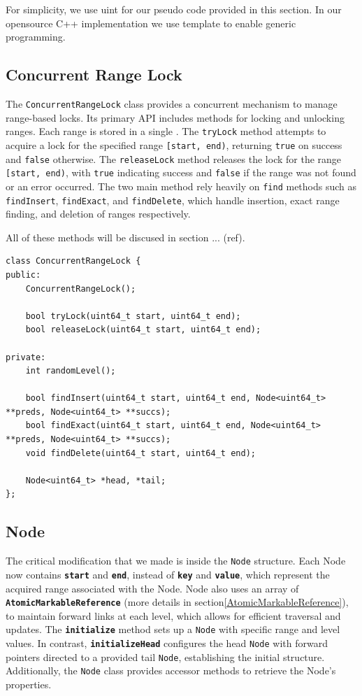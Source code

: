For simplicity, we use uint for our pseudo code provided in this section. In our opensource C++ implementation we use template to enable generic programming.

\subsection{Concurrent Range Lock}

The \texttt{ConcurrentRangeLock} class provides a concurrent mechanism to manage range-based locks. Its primary API includes methods for locking and unlocking ranges. Each range is stored in a single \texttt{}. The \texttt{tryLock} method attempts to acquire a lock for the specified range \texttt{[start, end)}, returning \texttt{true} on success and \texttt{false} otherwise. The \texttt{releaseLock} method releases the lock for the range \texttt{[start, end)}, with \texttt{true} indicating success and \texttt{false} if the range was not found or an error occurred. The two main method rely heavily on \texttt{find} methods such as \texttt{findInsert}, \texttt{findExact}, and \texttt{findDelete}, which handle insertion, exact range finding, and deletion of ranges respectively.

All of these methods will be discused in section ... (ref).

\begin{lstlisting}[style=mystyle, caption=Concurrent Range Lock]
class ConcurrentRangeLock {
public:
    ConcurrentRangeLock();

    bool tryLock(uint64_t start, uint64_t end);
    bool releaseLock(uint64_t start, uint64_t end);

private:
    int randomLevel();

    bool findInsert(uint64_t start, uint64_t end, Node<uint64_t> **preds, Node<uint64_t> **succs);
    bool findExact(uint64_t start, uint64_t end, Node<uint64_t> **preds, Node<uint64_t> **succs);
    void findDelete(uint64_t start, uint64_t end);

    Node<uint64_t> *head, *tail;
};
\end{lstlisting}

\subsection{Node}

The critical modification that we made is inside the \texttt{Node} structure. Each Node now contains \textbf{\texttt{start}} and \textbf{\texttt{end}}, instead of \textbf{\texttt{key}} and \textbf{\texttt{value}}, which represent the acquired range associated with the Node. Node also uses an array of \textbf{\texttt{AtomicMarkableReference}} (more details in section\ref{AtomicMarkableReference}), to maintain forward links at each level, which allows for efficient traversal and updates. The \textbf{\texttt{initialize}} method sets up a \texttt{Node} with specific range and level values. In contrast, \textbf{\texttt{initializeHead}} configures the head \texttt{Node} with forward pointers directed to a provided tail \texttt{Node}, establishing the initial structure. Additionally, the \texttt{Node} class provides accessor methods to retrieve the Node's properties.

